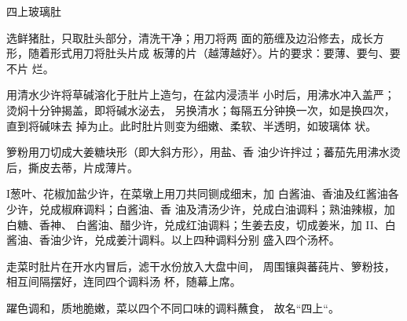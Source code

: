 \begin{recipe}{四上玻璃肚}

\ingredients


\cooking

\step 选鲜猪肚，只取肚头部分，清洗干净；用刀将两 面的筋缠及边沿修去，成长方形，随着形式用刀将肚头片成 板薄的片（越薄越好〉。片的要求：要薄、要勻、要不片 烂。

\step 用清水少许将草碱溶化于肚片上造匀，在盆内浸渍半 小时后，用沸水冲入盖严；烫焖十分钟揭盖，即将碱水泌去， 另换清水；每隔五分钟换一次，如是换四次，直到将碱味去 掉为止。此时肚片则变为细嫩、柔软、半透明，如玻璃体 状。

箩粉用刀切成大姜糖块形（即大斜方形〉，用盐、香 油少许拌过；蕃茄先用沸水烫后，撕皮去蒂，片成薄片。

I葱叶、花椒加盐少许，在菜墩上用刀共同铡成细末，加 白酱油、香油及红酱油各少许，兑成椒麻调料；白酱油、香 油及清汤少许，兑成白油调料；熟油辣椒，加白糖、香神、 白酱油、醋少许，兑成红油调料；生姜去皮，切成姜米，加 II、白酱油、香油少许，兑成姜汁调料。以上四种调料分别 盛入四个汤杯。

\step 走菜时肚片在开水内冒后，滤干水份放入大盘中间， 周围镶與蕃莼片、箩粉技，相互间隔摆好，连同四个调料汤 杯，随幕上席。

\notes

躍色调和，质地脆嫩，菜以四个不同口味的调料蘸食， 故名“四上“。

\end{recipe}


